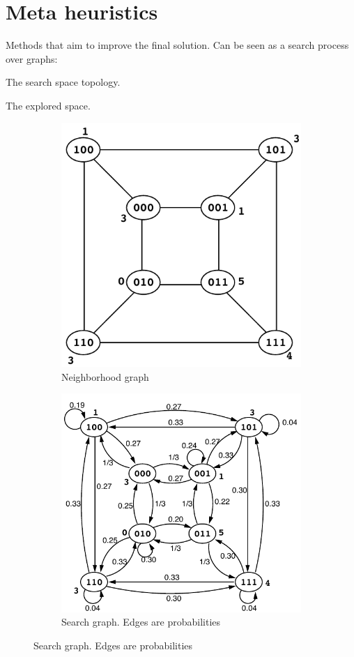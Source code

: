 \section{Meta heuristics}
Methods that aim to improve the final solution.
Can be seen as a search process over graphs:
\begin{descriptionlist}
    \item[Neighborhood graph] The search space topology.
    \item[Search graph] The explored space.
\end{descriptionlist}
\begin{figure}[ht]
    \begin{subfigure}{.5\textwidth}
        \centering
        \includegraphics[width=.55\linewidth]{img/_local_search_neigh_graph.pdf}
        \caption{Neighborhood graph}
    \end{subfigure}%
    \begin{subfigure}{.5\textwidth}
        \centering
        \includegraphics[width=.60\linewidth]{img/_local_search_search_graph.pdf}
        \caption{Search graph. Edges are probabilities}
    \end{subfigure}
\end{figure}

